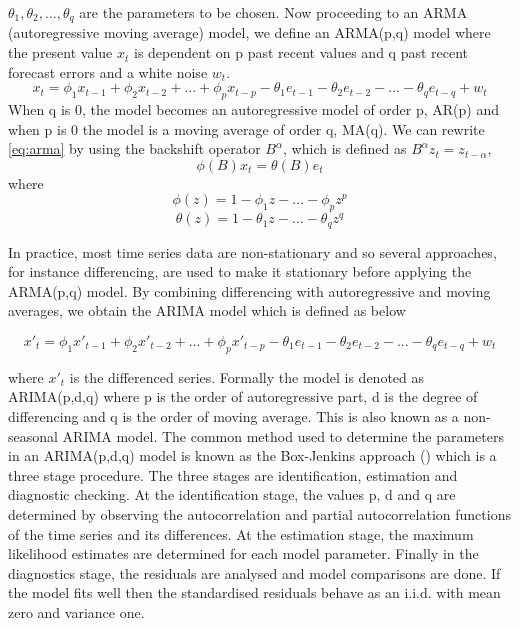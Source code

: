 $\theta_{1}, \theta_{2},..., \theta_{q}$ are the parameters to be chosen.
Now proceeding to an ARMA (autoregressive moving average) model, we define an ARMA(p,q) model where the present value $x_{t}$ is dependent on p past recent values and q past recent forecast errors and a white noise $w_{t}$.
        \begin{equation} \label{eq:arma}
          x_{t} = \phi_{1}x_{t-1} + \phi_{2}x_{t-2} + ... + \phi_{p}x_{t-p} - \theta_{1}e_{t-1}
          - \theta_{2}e_{t-2} - ... - \theta_{q}e_{t-q} + w_{t}
        \end{equation}
When q is 0, the model becomes an autoregressive model of order p, AR(p) and when p is 0 the model is a moving average of order q, MA(q). We can rewrite \ref{eq:arma} by using the backshift operator $B^{\alpha}$, which is defined as $B^{\alpha}z_{t} = z_{t-\alpha}$,
        \begin{equation} \label{eq:armarewrite}
          \phi(B)x_{t} = \theta(B)e_{t}
        \end{equation}
where
        \begin{equation}
            \phi(z) = 1 - \phi_{1}z - ... - \phi_{p}z^{p}
        \end{equation}
        \begin{equation}
            \theta(z) = 1 - \theta_{1}z - ... - \theta_{q}z^{q}
        \end{equation}

In practice, most time series data are non-stationary and so several approaches, for instance differencing, are used to make it stationary before applying the ARMA(p,q) model. By combining differencing with autoregressive and moving averages, we obtain the ARIMA model which is defined as below

        \begin{equation} \label{eq:arima}
          x'_{t} = \phi_{1}x'_{t-1} + \phi_{2}x'_{t-2} + ... + \phi_{p}x'_{t-p} -
          \theta_{1}e_{t-1} - \theta_{2}e_{t-2} - ... - \theta_{q}e_{t-q} + w_{t}
        \end{equation}

where $x'_{t}$ is the differenced series. Formally the model is denoted as ARIMA(p,d,q) where p is the order of autoregressive part, d is the degree of differencing and q is the order of moving average. This is also known as a non-seasonal ARIMA model.
The common method used to determine the parameters in an ARIMA(p,d,q) model is known as the Box-Jenkins approach (\cite{box2015time}) which is a three stage procedure. The three stages are identification, estimation and diagnostic checking. At the identification stage, the values p, d and q are determined by observing the autocorrelation and partial autocorrelation functions of the time series and its differences. At the estimation stage, the maximum likelihood estimates are determined for each model parameter. Finally in the diagnostics stage, the residuals are analysed and model comparisons are done. If the model fits well then the standardised residuals behave as an i.i.d. with mean zero and variance one.
